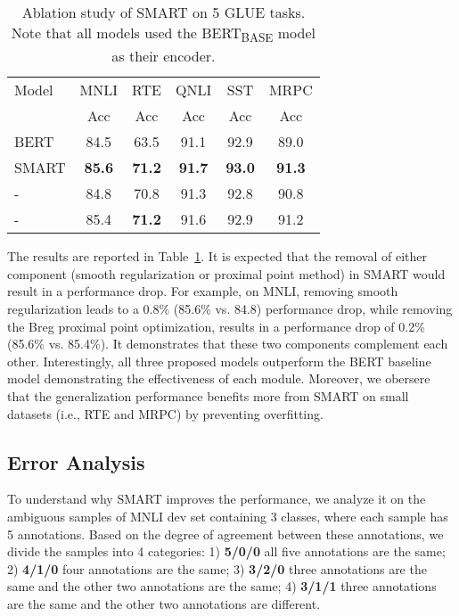 \documentclass[11pt]{article} \usepackage{url}
\newcommand\model{SMART}
\begin{document}
\begin{table}[!htb]
\centering
    \begin{tabular}{l|c@{\hskip1pt}|c@{\hskip1pt}|c@{\hskip1pt}|c@{\hskip1pt} | c@{\hskip1pt}}
    \hline
   Model                        &MNLI   &RTE    & QNLI  &SST    &MRPC \\ 
                                &Acc    &Acc    &Acc    &Acc    &Acc  \\\hline \hline 
      BERT                      &84.5   &63.5   &91.1   &92.9   &89.0 \\ \hline
     {\model}                   &\textbf{85.6}  &\textbf{71.2}  &\textbf{91.7}   &\textbf{93.0}   &\textbf{91.3} \\ \hline
     -             &84.8   &70.8   &91.3   &92.8   &90.8\\ \hline     
 -                &85.4   &\textbf{71.2}   &91.6   &92.9   &91.2\\ \hline     
    \end{tabular}
\caption{Ablation study of {\model} on 5 GLUE tasks. Note that all models used the BERT\textsubscript{BASE} model as their encoder.}
    \label{tab:smart_abl}
\end{table}

The results are reported in Table~\ref{tab:smart_abl}. It is expected that the removal of either component (smooth regularization or proximal point method) in {\model} would result in a performance drop. For example, on MNLI, removing smooth regularization leads to a 0.8\% (85.6\% vs. 84.8) performance drop, while removing the Breg proximal point optimization, results in a performance drop of 0.2\% (85.6\% vs. 85.4\%). It demonstrates that these two components complement each other. Interestingly, all three proposed models outperform the BERT baseline model demonstrating the effectiveness of each module. Moreover, we obersere that the generalization performance benefits more from {\model}  on small datasets (i.e., RTE and MRPC) by preventing overfitting. 





















\subsection{Error Analysis}
\label{subsec:error}
To understand why {\model} improves the performance, we analyze it on the ambiguous samples of MNLI dev set containing 3 classes, where each sample has 5 annotations. Based on the degree of agreement between these annotations, we divide the samples into 4 categories: 
1) \textbf{5/0/0} all five annotations are the same; 2) \textbf{4/1/0} four annotations are the same; 3) \textbf{3/2/0} three annotations are the same and the other two annotations are the same; 4) \textbf{3/1/1} three annotations are the same and the other two annotations are different.
\end{document}
